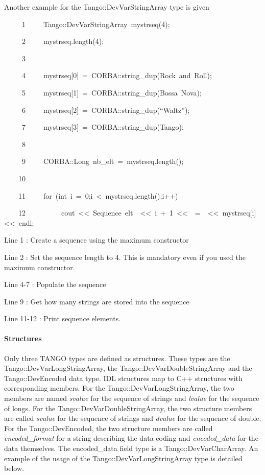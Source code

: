 Another example for the Tango::DevVarStringArray
type is given


\begin{lyxcode}
~~~~~1~~~~~Tango::DevVarStringArray~mystrseq(4);

~~~~~2~~~~~mystrseq.length(4);

~~~~~3~~

~~~~~4~~~~~mystrseq{[}0{]}~=~CORBA::string\_dup(\textquotedbl{}Rock~and~Roll\textquotedbl{});

~~~~~5~~~~~mystrseq{[}1{]}~=~CORBA::string\_dup(\textquotedbl{}Bossa~Nova\textquotedbl{});

~~~~~6~~~~~mystrseq{[}2{]}~=~CORBA::string\_dup(``Waltz'');

~~~~~7~~~~~mystrseq{[}3{]}~=~CORBA::string\_dup(\textquotedbl{}Tango\textquotedbl{});

~~~~~8~~

~~~~~9~~~~~CORBA::Long~nb\_elt~=~mystrseq.length();

~~~~10~~

~~~~11~~~~~for~(int~i~=~0;i~<~mystrseq.length();i++)

~~~~12~~~~~~~~~~cout~<\textcompwordmark{}<~\textquotedbl{}Sequence~elt~\textquotedbl{}~<\textcompwordmark{}<~i~+~1~<\textcompwordmark{}<~\textquotedbl{}~=~\textquotedbl{}~<\textcompwordmark{}<~mystrseq{[}i{]}~<\textcompwordmark{}<~endl;
\end{lyxcode}


Line 1 : Create a sequence using the maximum constructor

Line 2 : Set the sequence length to 4. This is mandatory even if you
used the maximum constructor.

Line 4-7 : Populate the sequence

Line 9 : Get how many strings are stored into the sequence

Line 11-12 : Print sequence elements.

\paragraph{Structures}

Only three TANGO types are defined as structures. These types are
the Tango::DevVarLongStringArray,
the Tango::DevVarDoubleStringArray
and the Tango::DevEncoded data type. IDL
structures map to C++ structures with corresponding members. For the
Tango::DevVarLongStringArray, the two members are named \emph{svalue}
for the sequence of strings and \emph{lvalue} for the
sequence of longs. For the Tango::DevVarDoubleStringArray, the two
structure members are called \emph{svalue} for the sequence of strings
and \emph{dvalue} for the sequence of double. For the
Tango::DevEncoded, the two structure members are called \emph{encoded\_format}
for a string describing the data coding and \emph{encoded\_data}
for the data themselves. The encoded\_data field type is a Tango::DevVarCharArray.
An example of the usage of the Tango::DevVarLongStringArray type is
detailed below.


